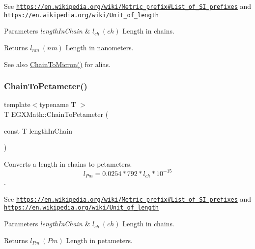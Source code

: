 See \href{https://en.wikipedia.org/wiki/Metric_prefix#List_of_SI_prefixes}{\tt https\+://en.\+wikipedia.\+org/wiki/\+Metric\+\_\+prefix\#\+List\+\_\+of\+\_\+\+S\+I\+\_\+prefixes} and \href{https://en.wikipedia.org/wiki/Unit_of_length}{\tt https\+://en.\+wikipedia.\+org/wiki/\+Unit\+\_\+of\+\_\+length} 
\begin{DoxyParams}{Parameters}
{\em length\+In\+Chain} & $ l_{ch}\ (ch)$ Length in chains. \\
\hline
\end{DoxyParams}
\begin{DoxyReturn}{Returns}
$ l_{nm}\ (nm)$ Length in nanometers. 
\end{DoxyReturn}
\begin{DoxySeeAlso}{See also}
\mbox{\hyperlink{group___e_g_x_math-_conversions-_length_conversions-_surveyors-_chain-_non-_s_i_ga9efe9ceb0ab30639026cbb4158bb0148}{Chain\+To\+Micron()}} for alias. 
\end{DoxySeeAlso}
\mbox{\label{group___e_g_x_math-_conversions-_length_conversions-_surveyors-_chain-_s_i_ga4a40c43d2437af26f04a678f438451ce}} 
\subsubsection{\texorpdfstring{Chain\+To\+Petameter()}{ChainToPetameter()}}
{\footnotesize\ttfamily template$<$typename T $>$ \\
T E\+G\+X\+Math\+::\+Chain\+To\+Petameter (\begin{DoxyParamCaption}\item[{const T}]{length\+In\+Chain }\end{DoxyParamCaption})}



Converts a length in chains to petameters. \[ l_{Pm}=0.0254 * 792 * l_{ch} * 10^{-15} \]. 

See \href{https://en.wikipedia.org/wiki/Metric_prefix#List_of_SI_prefixes}{\tt https\+://en.\+wikipedia.\+org/wiki/\+Metric\+\_\+prefix\#\+List\+\_\+of\+\_\+\+S\+I\+\_\+prefixes} and \href{https://en.wikipedia.org/wiki/Unit_of_length}{\tt https\+://en.\+wikipedia.\+org/wiki/\+Unit\+\_\+of\+\_\+length} 
\begin{DoxyParams}{Parameters}
{\em length\+In\+Chain} & $ l_{ch}\ (ch)$ Length in chains. \\
\hline
\end{DoxyParams}
\begin{DoxyReturn}{Returns}
$ l_{Pm}\ (Pm)$ Length in petameters. 
\end{DoxyReturn}
\mbox{\label{group___e_g_x_math-_conversions-_length_conversions-_surveyors-_chain-_s_i_ga27f06f3f63727a16e02afaf8f01f4b45}} 
